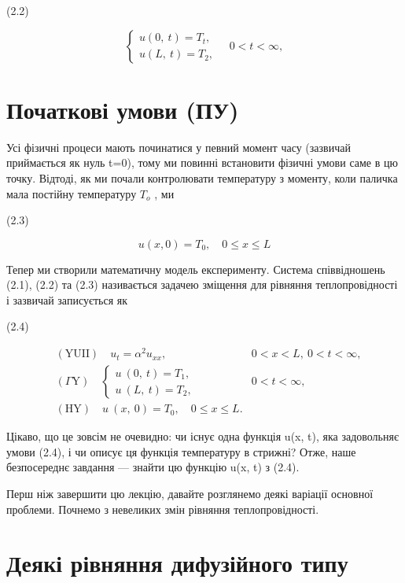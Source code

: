 \documentclass[
  ukrainian,
]{article}
\begin{document}
(2.2)

\[\left\{ \begin{array}{l} u\left(0,\ t\right) = T_{t}, \\ u\left(L,\ t\right) = T_{2}, \end{array} \right. \quad 0 < t < \infty,\]

\section{Початкові умови
(ПУ)}\label{ux43fux43eux447ux430ux442ux43aux43eux432ux456-ux443ux43cux43eux432ux438-ux43fux443}

Усі фізичні процеси мають починатися у певний момент часу (зазвичай
приймається як нуль t=0), тому ми повинні встановити фізичні умови саме
в цю точку. Відтоді, як ми почали контролювати температуру з моменту,
коли паличка мала постійну температуру \(T_{\mathrm{ }o}\) , ми

(2.3)

\[u(x, 0) = T_0, \quad 0 \le x \le L\]

Тепер ми створили математичну модель експерименту. Система співвідношень
(2.1), (2.2) та (2.3) називається задачею зміщення для рівняння
теплопровідності і зазвичай записується як

(2.4)

\[\begin{aligned} & (\text{YUII}) \quad u_t = \alpha^2 u_{xx}, & 0 < x < L, \ 0 < t < \infty, \\ & \left( \Gamma \text{Y} \right) \quad \begin{cases} u \ (0, \ t) = T_1, \\ u \ (L, \ t) = T_2, \end{cases} & 0 < t < \infty, \\ & (\text{HY}) \quad u \ (x, \ 0) = T_0, \quad 0 \leqslant x \leqslant L. \end{aligned}\]

Цікаво, що це зовсім не очевидно: чи існує одна функція u(x, t), яка
задовольняє умови (2.4), і чи описує ця функція температуру в стрижні?
Отже, наше безпосереднє завдання --- знайти цю функцію u(x, t) з (2.4).

Перш ніж завершити цю лекцію, давайте розглянемо деякі варіації основної
проблеми. Почнемо з невеликих змін рівняння теплопровідності.

\section{Деякі рівняння дифузійного
типу}\label{ux434ux435ux44fux43aux456-ux440ux456ux432ux43dux44fux43dux43dux44f-ux434ux438ux444ux443ux437ux456ux439ux43dux43eux433ux43e-ux442ux438ux43fux443}
\end{document}
